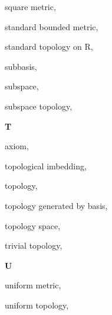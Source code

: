 \begin{multicols}{2}
square metric, \pageref{def:SquareMetric}

standard bounded metric, \pageref{def:StandardBoundedMetric}

standard topology on R, \pageref{def:StandardTopologyOnTheRealLine}

subbasis, \pageref{def:Subbasis}

subspace, \pageref{def:SubspaceTopology}

subspace topology, \pageref{def:SubspaceTopology}

\vspace{1em}\noindent\large{\textbf{T}}

 axiom, \pageref{def:T1Axiom}

topological imbedding, \pageref{def:TopologicalImbedding}

topology, \pageref{def:Topology}

topology generated by basis, \pageref{def:TopologyGeneratedByBasis}

topology space, \pageref{def:TopologySpace}

trivial topology, \pageref{def:TrivialTopology}

\vspace{1em}\noindent\large{\textbf{U}}

uniform metric, \pageref{def:UniformMetric}

uniform topology, \pageref{def:UniformMetric}

\end{multicols}